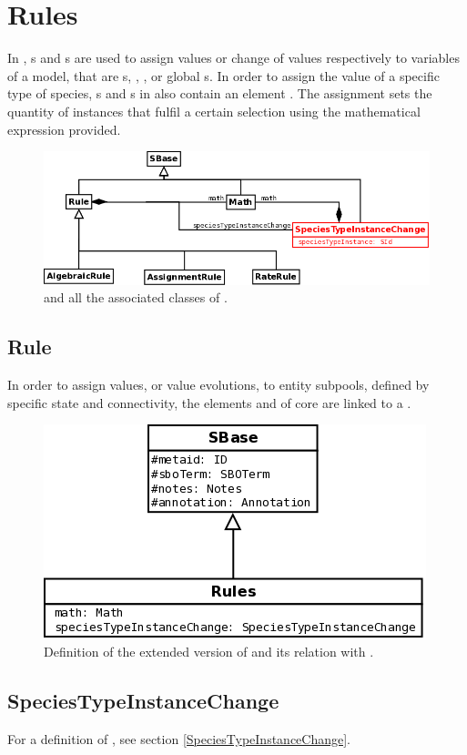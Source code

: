 \section{Rules}

In \sbmlLthreeVone, s and s are used to assign values or change of values respectively to variables of a model, that are s, , , or global s.  In order to assign the value of a specific type of species, s and  s in \multiVone also contain an element . The assignment sets the quantity of instances that fulfil a certain selection using the mathematical expression provided. 

\begin{figure}[h!]
\begin{center}
\includegraphics[scale=0.3]{./figs/pngs/RuleGeneral.png}
\caption{ and all the associated classes of \multiVone.}
\end{center}
\end{figure}

\subsection{Rule}

In order to assign values, or value evolutions, to entity subpools, defined by specific state and connectivity, the elements  and  of \sbmlLthreeVone core are linked to a .

\begin{figure}[H]
\begin{center}
\includegraphics[scale=0.4]{figs/pngs/RuleClass.png} 
\caption{Definition of the extended version of  and its relation with .}
\label{fig:RuleClass}
\end{center}
\end{figure}

\subsection{SpeciesTypeInstanceChange}

For a definition of , see section \ref{SpeciesTypeInstanceChange}.